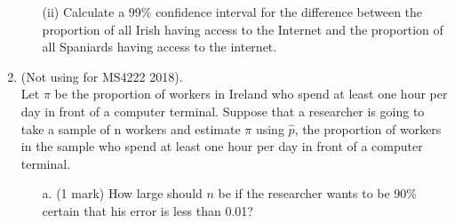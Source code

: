 \documentclass[]{article}
\begin{document}
\begin{enumerate}
\begin{itemize}
	\item[(ii)] Calculate a 99\% confidence interval for the difference between the proportion of all Irish
	having access to the Internet and the proportion of all Spaniards having access to the
	internet.
\end{itemize}

\item (Not using for MS4222 2018).\\
Let $\pi$ be the proportion of workers in Ireland who spend at least one hour
per day in front of a computer terminal. Suppose that a researcher is going to take a
sample of n workers and estimate $\pi$ using $\hat{p}$, the proportion of workers in the sample
who spend at least one hour per day in front of a computer terminal.

\begin{itemize}
	\item[a.] (1 mark) How large
	should $n$ be if the researcher wants to be 90\% certain that his error is less than 0.01?
\end{itemize}
\end{enumerate}
\end{document}
